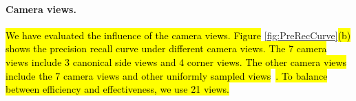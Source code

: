 \paragraph*{Camera views.} \hl{We have evaluated the influence of the camera views. Figure }\ref{fig:PreRecCurve}\hl{(b) shows the precision recall curve under different camera views. The 7 camera views include 3 canonical side views and 4 corner views. The other camera views include the 7 camera views and other uniformly sampled views}~\cite{FanWang2013}\hl{. To balance between efficiency and effectiveness, we use 21 views.} 